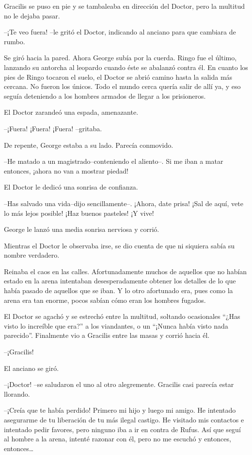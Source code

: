 Gracilis se puso en pie y se tambaleaba en dirección del Doctor, pero la
multitud no le dejaba pasar.

--¡Te veo fuera! --le gritó el Doctor, indicando al anciano para que
cambiara de rumbo.

Se giró hacia la pared. Ahora George subía por la cuerda. Ringo fue el
último, lanzando su antorcha al leopardo cuando éste se abalanzó contra
él. En cuanto los pies de Ringo tocaron el suelo, el Doctor se abrió
camino hasta la salida más cercana. No fueron los únicos. Todo el mundo
cerca quería salir de allí ya, y eso seguía deteniendo a los hombres
armados de llegar a los prisioneros.

El Doctor zarandeó una espada, amenazante.

--¡Fuera! ¡Fuera! ¡Fuera! --gritaba.

De repente, George estaba a su lado. Parecía conmovido.

--He matado a un magistrado--conteniendo el aliento--. Si me iban a
matar entonces, ¡ahora no van a mostrar piedad!

El Doctor le dedicó una sonrisa de confianza.

--Has salvado una vida--dijo sencillamente--. ¡Ahora, date prisa! ¡Sal
de aquí, vete lo más lejos posible! ¡Haz buenos pasteles! ¡Y vive!

George le lanzó una media sonrisa nerviosa y corrió.

Mientras el Doctor le observaba irse, se dio cuenta de que ni siquiera
sabía su nombre verdadero.

Reinaba el caos en las calles. Afortunadamente muchos de aquellos que no
habían estado en la arena intentaban desesperadamente obtener los
detalles de lo que había pasado de aquellos que se iban. Y lo otro
afortunado era, pues como la arena era tan enorme, pocos sabían cómo
eran los hombres fugados.

El Doctor se agachó y se estrechó entre la multitud, soltando
ocasionales ``¿Has visto lo increíble que era?'' a los viandantes, o un
``¡Nunca había visto nada parecido''. Finalmente vio a Gracilis entre
las masas y corrió hacia él.

--¡Gracilis!

El anciano se giró.

--¡Doctor! --se saludaron el uno al otro alegremente. Gracilis casi
parecía estar llorando.

--¡Creía que te había perdido! Primero mi hijo y luego mi amigo. He
intentado asegurarme de tu liberación de tu más ilegal castigo. He
visitado mis contactos e intentado pedir favores, pero ninguno iba a ir
en contra de Rufus. Así que seguí al hombre a la arena, intenté razonar
con él, pero no me escuchó y entonces, entonces\ldots{}

